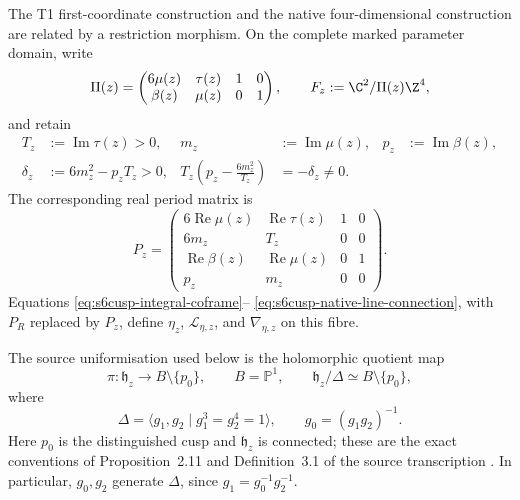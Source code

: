 The T1 first-coordinate construction and the native four-dimensional
construction are related by a restriction morphism.  On the complete marked
parameter domain, write
\begin{equation}\label{eq:s6cusp-general-marked-fibre}
 \Pi(z)=
 \begin{pmatrix}
 6\mu(z)&\tau(z)&1&0\\
 \beta(z)&\mu(z)&0&1
 \end{pmatrix},
 \qquad
 F_z:=\C^2/\Pi(z)\Z^4,
\end{equation}
and retain
\begin{align}
 T_z&:=\operatorname{Im}\tau(z)>0,&
 m_z&:=\operatorname{Im}\mu(z),&
 p_z&:=\operatorname{Im}\beta(z),
 \label{eq:s6cusp-general-imaginary-coordinates}\\
 \delta_z&:=6m_z^2-p_zT_z>0,&
 T_z\left(p_z-\frac{6m_z^2}{T_z}\right)&=-\delta_z\ne0.
 \label{eq:s6cusp-general-unchanged-expression}
\end{align}
The corresponding real period matrix is
\begin{equation}\label{eq:s6cusp-general-real-period-matrix}
 P_z=
 \begin{pmatrix}
 6\operatorname{Re}\mu(z)&\operatorname{Re}\tau(z)&1&0\\
 6m_z&T_z&0&0\\
 \operatorname{Re}\beta(z)&\operatorname{Re}\mu(z)&0&1\\
 p_z&m_z&0&0
 \end{pmatrix}.
\end{equation}
Equations \eqref{eq:s6cusp-integral-coframe}--
\eqref{eq:s6cusp-native-line-connection}, with \(P_R\) replaced by
\(P_z\), define \(\eta_z\), \(\mathcal L_{\eta,z}\), and
\(\nabla_{\eta,z}\) on this fibre.

The source uniformisation used below is the holomorphic quotient map
\begin{equation}\label{eq:s6cusp-source-uniformisation}
 \pi:\mathfrak h_z\longrightarrow B\setminus\{p_0\},
 \qquad
 B=\mathbb P^1,
 \qquad
 \mathfrak h_z/\Delta\simeq B\setminus\{p_0\},
\end{equation}
where
\begin{equation}\label{eq:s6cusp-source-deck-presentation}
 \Delta=\langle g_1,g_2\mid g_1^3=g_2^4=1\rangle,
 \qquad
 g_0=(g_1g_2)^{-1}.
\end{equation}
Here \(p_0\) is the distinguished cusp and \(\mathfrak h_z\) is connected;
these are the exact conventions of Proposition~2.11 and
Definition~3.1 of the source transcription \cite{S6Internal}.  In particular,
\(g_0,g_2\) generate \(\Delta\), since
\(g_1=g_0^{-1}g_2^{-1}\).

